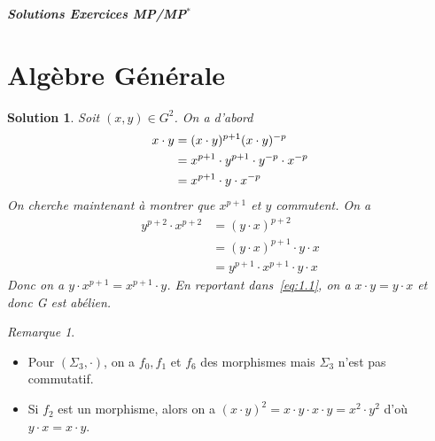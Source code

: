 \documentclass[12pt]{article}
\newtheorem{solution}{Solution}[section]
\theoremstyle{remark}
\newtheorem{remark}{Remarque}[section]
\numberwithin{equation}{section}
\begin{document}
\begin{titlepage}
	\centering
	\vspace*{\fill}
	\Huge \textit{\textbf{Solutions Exercices MP/MP$^*$}}
	\vspace*{\fill}
\end{titlepage}

\cleardoublepage

\tableofcontents

\cleardoublepage

\section{Algèbre Générale}

\begin{solution}
	Soit $(x,y)\in G^{2}$. On a d'abord
	\begin{align}
		x\cdot y
		&=(x\cdot y)^{p+1}(x\cdot y)^{-p} \notag \\
		&=x^{p+1}\cdot y^{p+1}\cdot y^{-p}\cdot x^{-p}\notag \\
		&=x^{p+1}\cdot y \cdot x^{-p} \label{eq:1.1}
	\end{align}
	On cherche maintenant à montrer que $x^{p+1}$ et $y$ commutent.
	On a
	\begin{align*}
		y^{p+2}\cdot x^{p+2}
		&=(y\cdot x)^{p+2}\\
		&=(y\cdot x)^{p+1}\cdot y\cdot x\\
		&=y^{p+1}\cdot x^{p+1}\cdot y\cdot x
	\end{align*}
	Donc on a $y\cdot x^{p+1}=x^{p+1}\cdot y$. En reportant dans~\eqref{eq:1.1}, on a $x\cdot y=y\cdot x$ et donc G est abélien.
\end{solution}

\begin{remark}
	\phantom{}
	\begin{itemize}
		\item Pour $(\Sigma_{3},\cdot)$, on a $f_{0},f_{1}$ et $f_{6}$ des morphismes mais $\Sigma_{3}$ n'est pas commutatif.
		\item Si $f_{2}$ est un morphisme, alors on a $(x\cdot y)^{2}=x\cdot y\cdot x\cdot y=x^{2}\cdot y^{2}$ d'où $y\cdot x=x\cdot y$.
	\end{itemize}
\end{remark}
\end{document}
